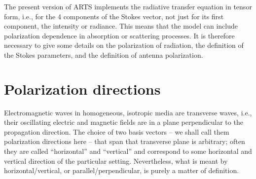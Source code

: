 The present version of ARTS implements the radiative transfer equation
in tensor form, i.e., for the 4 components of the Stokes vector, not
just for its first component, the intensity or radiance.
This means that the model can include polarization dependence in
absorption or scattering processes.
It is therefore necessary to give some details on the polarization of
radiation, the definition of
the Stokes parameters, and the definition of antenna polarization.

\section{Polarization directions}
\label{sec:polarization:directions}
Electromagnetic waves in homogeneous, isotropic media are transverse
waves, i.e., their oscillating electric and magnetic fields are in a
plane perpendicular to the propagation direction. The choice of two
basis vectors -- we shall call them polarization directions here --
that span that transverse plane is arbitrary; often they are called
``horizontal'' and ``vertical'' and correspond to some horizontal and
vertical direction of the particular setting. Nevertheless, what is
meant by horizontal/vertical, or parallel/perpendicular, is purely a
matter of definition.

